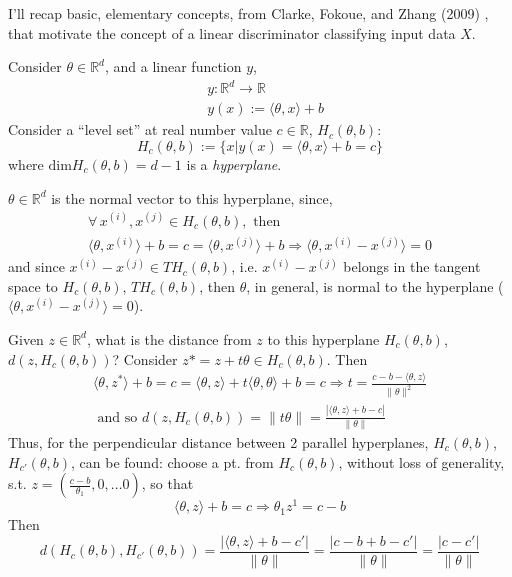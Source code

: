 \documentclass[10pt]{amsart}
\begin{document}
\begin{multicols*}{2}
I'll recap basic, elementary concepts, from Clarke, Fokoue, and Zhang (2009) \cite{CFZ2009}, that motivate the concept of a linear discriminator classifying input data $X$.

Consider $\theta\in \mathbb{R}^d$, and a linear function $y$,
\begin{equation}\label{Eq:yforhyperplane}
\begin{aligned}
& y:\mathbb{R}^d \to \mathbb{R} \\
  & y(x) := \langle \theta,x \rangle +b 
  \end{aligned}
\end{equation}
Consider a ``level set'' at real number value $c\in \mathbb{R}$, $H_c(\theta,b)$:
\begin{equation}\label{Eq:H_cHyperplane}
H_c(\theta,b):=\lbrace x|y(x) = \langle \theta,x\rangle +b =c \rbrace 
  \end{equation}
where $\text{dim}H_c(\theta,b)=d-1$ is a \emph{hyperplane}.

$\theta\in \mathbb{R}^d$ is the normal vector to this hyperplane, since,
\[
\begin{gathered}
  \forall \, x^{(i)}, x^{(j)} \in H_c(\theta,b), \text{ then } \\
  \langle \theta, x^{(i)} \rangle + b = c = \langle \theta , x^{(j)}\rangle + b \Longrightarrow \langle \theta, x^{(i)} - x^{(j)} \rangle = 0 
  \end{gathered}
\]
and since $x^{(i)} - x^{(j)} \in TH_c(\theta,b)$, i.e. $x^{(i)} - x^{(j)}$ belongs in the tangent space to $H_c(\theta,b)$, $TH_c(\theta,b)$, then $\theta$, in general, is normal to the hyperplane ($\langle \theta, x^{(i)} - x^{(j)} \rangle =0$).

Given $z\in \mathbb{R}^d$, what is the distance from $z$ to this hyperplane $H_c(\theta,b)$, $d(z,H_c(\theta,b))$?  Consider $z* = z+t\theta\in H_c(\theta,b)$.  Then
\[
\begin{gathered}
  \langle \theta, z^*\rangle + b=c = \langle \theta,z \rangle + t\langle \theta, \theta\rangle + b = c \Longrightarrow t=\frac{ c-b-\langle \theta,z\rangle }{ \| \theta \|^2}  \\
  \text{ and so }
  d(z,H_c(\theta,b)) = \| t\theta \| = \frac{ | \langle \theta , z \rangle +b- c | }{\| \theta \| } 
  \end{gathered}
\]
Thus, for the perpendicular distance between 2 parallel hyperplanes, $H_c(\theta,b)$, $H_{c'}(\theta,b)$, can be found: choose a pt. from $H_c(\theta,b)$, without loss of generality, s.t. $z=\left( \frac{c-b}{\theta_1},0 , \dots 0 \right)$, so that
\[
\langle \theta,z \rangle + b=c \Longrightarrow \theta_1z^1 = c-b
\]
Then
\begin{equation}
d(H_c(\theta,b),H_{c'}(\theta,b)) = \frac{  | \langle \theta,z \rangle +b-c' | }{ \| \theta \| } = \frac{ | c-b+b-c' | }{ \| \theta \| } = \frac{ |c-c' | }{ \| \theta \| }
  \end{equation}


\end{multicols*}
\end{document}
